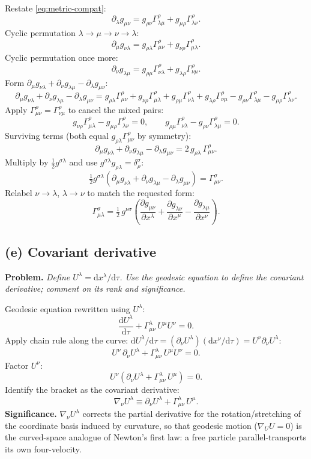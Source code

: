 \documentclass[11pt]{article}
\newcommand{\de}{\mathrm{d}}
\newcommand{\pd}[2]{\frac{\partial #1}{\partial #2}}
\begin{document}
Restate \eqref{eq:metric-compat}:
\[
\partial_\lambda g_{\mu\nu} = g_{\rho\nu}\Gamma^\rho_{\lambda\mu} + g_{\mu\rho}\Gamma^\rho_{\lambda\nu}.
\]
Cyclic permutation $\lambda\to\mu\to\nu\to\lambda$:
\[
\partial_\mu g_{\nu\lambda} = g_{\rho\lambda}\Gamma^\rho_{\mu\nu} + g_{\nu\rho}\Gamma^\rho_{\mu\lambda}.
\]
Cyclic permutation once more:
\[
\partial_\nu g_{\lambda\mu} = g_{\rho\mu}\Gamma^\rho_{\nu\lambda} + g_{\lambda\rho}\Gamma^\rho_{\nu\mu}.
\]
Form $\partial_\mu g_{\nu\lambda} + \partial_\nu g_{\lambda\mu} - \partial_\lambda g_{\mu\nu}$:
\[
\partial_\mu g_{\nu\lambda} + \partial_\nu g_{\lambda\mu} - \partial_\lambda g_{\mu\nu} = g_{\rho\lambda}\Gamma^\rho_{\mu\nu} + g_{\nu\rho}\Gamma^\rho_{\mu\lambda} + g_{\rho\mu}\Gamma^\rho_{\nu\lambda} + g_{\lambda\rho}\Gamma^\rho_{\nu\mu} - g_{\rho\nu}\Gamma^\rho_{\lambda\mu} - g_{\mu\rho}\Gamma^\rho_{\lambda\nu}.
\]
Apply $\Gamma^\rho_{\mu\nu}=\Gamma^\rho_{\nu\mu}$ to cancel the mixed pairs:
\[
g_{\nu\rho}\Gamma^\rho_{\mu\lambda} - g_{\mu\rho}\Gamma^\rho_{\lambda\nu} = 0,\qquad g_{\rho\mu}\Gamma^\rho_{\nu\lambda} - g_{\rho\nu}\Gamma^\rho_{\lambda\mu} = 0.
\]
Surviving terms (both equal $g_{\rho\lambda}\Gamma^\rho_{\mu\nu}$ by symmetry):
\[
\partial_\mu g_{\nu\lambda} + \partial_\nu g_{\lambda\mu} - \partial_\lambda g_{\mu\nu} = 2\,g_{\rho\lambda}\,\Gamma^\rho_{\mu\nu}.
\]
Multiply by $\tfrac{1}{2}g^{\sigma\lambda}$ and use $g^{\sigma\lambda}g_{\rho\lambda}=\delta^\sigma_\rho$:
\[
\tfrac{1}{2}g^{\sigma\lambda}\!\left(\partial_\mu g_{\nu\lambda} + \partial_\nu g_{\lambda\mu} - \partial_\lambda g_{\mu\nu}\right) = \Gamma^\sigma_{\mu\nu}.
\]
Relabel $\nu\to\lambda$, $\lambda\to\nu$ to match the requested form:
\[
\boxed{\;\Gamma^\sigma_{\mu\lambda} = \tfrac{1}{2}\,g^{\nu\sigma}\!\left(\pd{g_{\mu\nu}}{x^\lambda} + \pd{g_{\lambda\nu}}{x^\mu} - \pd{g_{\lambda\mu}}{x^\nu}\right).\;}
\]

\subsection*{(e) Covariant derivative}

\textbf{Problem.} \emph{Define $U^\lambda = \de x^\lambda/\de\tau$. Use the geodesic equation to define the covariant derivative; comment on its rank and significance.}

Geodesic equation rewritten using $U^\lambda$:
\[
\frac{\de U^\lambda}{\de\tau} + \Gamma^\lambda_{\mu\nu}\,U^\mu U^\nu = 0.
\]
Apply chain rule along the curve: $\de U^\lambda/\de\tau = (\partial_\nu U^\lambda)(\de x^\nu/\de\tau) = U^\nu\partial_\nu U^\lambda$:
\[
U^\nu\,\partial_\nu U^\lambda + \Gamma^\lambda_{\mu\nu}\,U^\mu U^\nu = 0.
\]
Factor $U^\nu$:
\[
U^\nu\!\left(\partial_\nu U^\lambda + \Gamma^\lambda_{\mu\nu}\,U^\mu\right) = 0.
\]
Identify the bracket as the covariant derivative:
\[
\boxed{\;\nabla_\nu U^\lambda \equiv \partial_\nu U^\lambda + \Gamma^\lambda_{\mu\nu}\,U^\mu.\;}
\]
\textbf{Significance.} $\nabla_\nu U^\lambda$ corrects the partial derivative for the rotation/stretching of the coordinate basis induced by curvature, so that geodesic motion ($\nabla_U U = 0$) is the curved-space analogue of Newton's first law: a free particle parallel-transports its own four-velocity.
\end{document}

